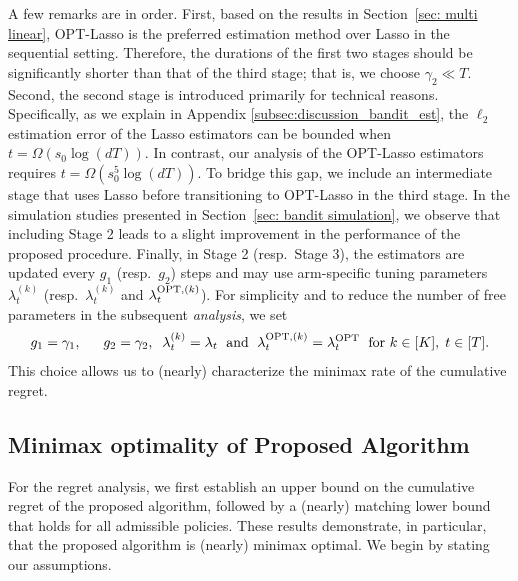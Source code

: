 \documentclass[aos,preprint]{imsart}
\theoremstyle{plain}
\theoremstyle{definition}
\begin{document}
A few remarks are in order. First, based on the results in Section~\ref{sec: multi linear}, OPT-Lasso is the preferred estimation method over Lasso in the sequential setting. Therefore, the durations of the first two stages should be significantly shorter than that of the third stage; that is, we choose $\gamma_2 \ll T$. Second, the second stage is introduced primarily for technical reasons. Specifically, as we explain in Appendix \ref{subsec:discussion_bandit_est}, the $\ell_2$ estimation error of the Lasso estimators can be bounded when $t = \Omega(s_0 \log(dT))$. In contrast, our analysis of the OPT-Lasso estimators requires $t = \Omega(s_0^5 \log(dT))$. To bridge this gap, we include an intermediate stage that uses Lasso before transitioning to OPT-Lasso in the third stage. In the simulation studies presented in Section~\ref{sec: bandit simulation}, we observe that including Stage 2 leads to a slight improvement in the performance of the proposed procedure. Finally, in Stage 2 (resp.~Stage 3), the estimators are updated every $g_1$ (resp.~$g_2$) steps and may use arm-specific tuning parameters $\lambda_t^{(k)}$ (resp.~$\lambda_t^{(k)}$ and $\lambda_t^{\textup{OPT},(k)}$). For simplicity and to reduce the number of free parameters in the subsequent \textit{analysis}, we set
\begin{align}\label{parameters_for_analysis}
    g_1 = \gamma_1, \;\; \quad g_2 = \gamma_2, \;\; 
    \lambda_t^{(k)} = \lambda_t \;\text{ and }\;\lambda_t^{\textup{OPT},(k)} = \lambda_t^{\textup{OPT}}\; \text{ for } k \in [K],\; t \in [T].
\end{align}
This choice allows us to (nearly) characterize the minimax rate of the cumulative regret.



 







\subsection{Minimax optimality of Proposed Algorithm}\label{subsec:bandit_minimax}
For the regret analysis, we first establish an upper bound on the cumulative regret of the proposed algorithm, followed by a (nearly) matching lower bound that holds for all admissible policies. These results demonstrate, in particular, that the proposed algorithm is (nearly) minimax optimal. We begin by stating our assumptions.
\end{document}
